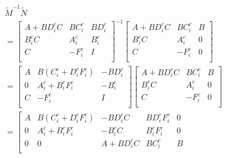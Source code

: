\documentclass[journal]{IEEEtran}
\begin{document}
\begin{equation}
  \begin{aligned}
     & \tilde{M}^{-1} \tilde{N}                                                                      \\
     & =\left[\begin{array}{cc|c}
        A+B D_{i}^{c} C & B    C_{i}^{c} & B    D_{i}^{c} \\
        B_{i}^{c}   C   & A_{i}^{c}      & B_{i}^{c}      \\
        \hline   C      & -F_{i}^{c}     & I              \\
      \end{array}\right]^{-1} \left[\begin{array}{cc|c}
        A+B    D_{i}^{c} C & B    C_{i}^{c} & B \\
        B_{i}^{c}   C      & A_{i}^{c}      & 0 \\
        \hline    C        & -F_{i}^{c}     & 0 \\
      \end{array}\right] \\
     & =\left[\begin{array}{cc|c}
        A          & B    (C_{i}^{c}+D_{i}^{c}F_{i}^{c}) & -B    D_{i}^{c} \\
        0          & A_{i}^{c}+B_{i}^{c}  F_{i}^{c}      & -B_{i}^{c}      \\
        \hline   C & -F_{i}^{c}                          & I               \\
      \end{array}\right]  \left[\begin{array}{cc|c}
        A+B    D_{i}^{c} C & B    C_{i}^{c} & B \\
        B_{i}^{c}   C      & A_{i}^{c}      & 0 \\
        \hline    C        & -F_{i}^{c}     & 0 \\
      \end{array}\right]     \\
     & =\left[\begin{array}{cccc|c}
        A          & B    (C_{i}^{c}+D_{i}^{c}F_{i}^{c}) & -B    D_{i}^{c}C   & B    D_{i}^{c}F_{i}^{c} & 0 \\
        0          & A_{i}^{c}+B_{i}^{c}   F_{i}^{c}     & -B_{i}^{c}  C      & B_{i}^{c}  F_{i}^{c}    & 0 \\
        0          & 0                                   & A+B    D_{i}^{c} C & B    C_{i}^{c}          & B \\

\end{array}
\end{aligned}
\end{equation}
\end{document}
